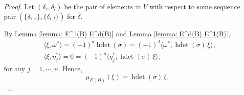 \documentclass[a4paper,10pt]{amsart}
\theoremstyle{definition}
\numberwithin{equation}{section}
\DeclareMathOperator{\hdet}{hdet}
\begin{document}
\begin{proof}
Let $(\delta_r,\delta_l)$ be the pair of elements in $V$ with respect to some sequence pair $(\{\delta_{i,r}\},\{\delta_{i,l}\})$ for $\overline{\delta}$.


By Lemma \ref{lemma: E^1(B) E^d(B)} and Lemma \ref{lemma: E^d(B) E^1(B)},
\begin{align*}
&\langle \xi, \omega^*\rangle=(-1)^d\hdet(\overline{\sigma})=(-1)^d\langle \omega^*, \hdet(\overline{\sigma})\, \xi\rangle,\\
&\langle \xi, \eta_j^*\rangle=0=(-1)^d\langle \eta_j^*, \hdet(\overline{\sigma})\, \xi\rangle,
\end{align*}
for any $j=1,\cdots,n$. Hence,
$$\mu_{E(B)}(\xi)=\hdet(\overline{\sigma})\,\xi.$$


\end{proof}
\end{document}
